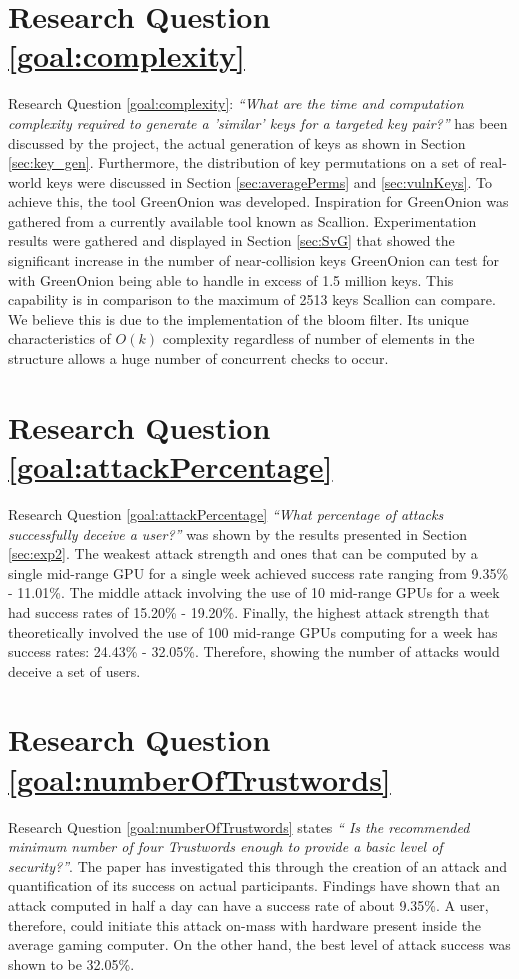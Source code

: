 \section{Research Question \ref{goal:complexity}}
Research Question \ref{goal:complexity}: \textit{``What are the time and computation complexity required to generate a ’similar’ keys for a targeted key pair?''} has been discussed by the project, the actual generation of keys as shown in Section \ref{sec:key_gen}. Furthermore, the distribution of key permutations on a set of real-world keys were discussed in Section \ref{sec:averagePerms} and \ref{sec:vulnKeys}. To achieve this, the tool GreenOnion was developed. Inspiration for GreenOnion was gathered from a currently available tool known as Scallion. Experimentation results were gathered and displayed in Section \ref{sec:SvG} that showed the significant increase in the number of near-collision keys GreenOnion can test for with GreenOnion being able to handle in excess of 1.5 million keys. This capability is in comparison to the maximum of 2513 keys Scallion can compare. We believe this is due to the implementation of the bloom filter. Its unique characteristics of $O(k)$ complexity regardless of number of elements in the structure allows a huge number of concurrent checks to occur. 

\section{Research Question \ref{goal:attackPercentage}}
Research Question \ref{goal:attackPercentage} \textit{``What percentage of attacks successfully deceive a user?''} was shown by the results presented in Section \ref{sec:exp2}. The weakest attack strength and ones that can be computed by a single mid-range GPU for a single week achieved success rate ranging from 9.35\% - 11.01\%. The middle attack involving the use of 10 mid-range GPUs for a week had success rates of 15.20\% - 19.20\%. Finally, the highest attack strength that theoretically involved the use of 100 mid-range GPUs computing for a week has success rates: 24.43\% - 32.05\%. Therefore, showing the number of attacks would deceive a set of users.

\section{Research Question \ref{goal:numberOfTrustwords}}
Research Question \ref{goal:numberOfTrustwords} states \textit{`` Is the recommended minimum number of four Trustwords enough to provide a basic level of security?''}. The paper has investigated this through the creation of an attack and quantification of its success on actual participants. Findings have shown that an attack computed in half a day can have a success rate of about 9.35\%. A user, therefore, could initiate this attack on-mass with hardware present inside the average gaming computer. On the other hand, the best level of attack success was shown to be 32.05\%. 

